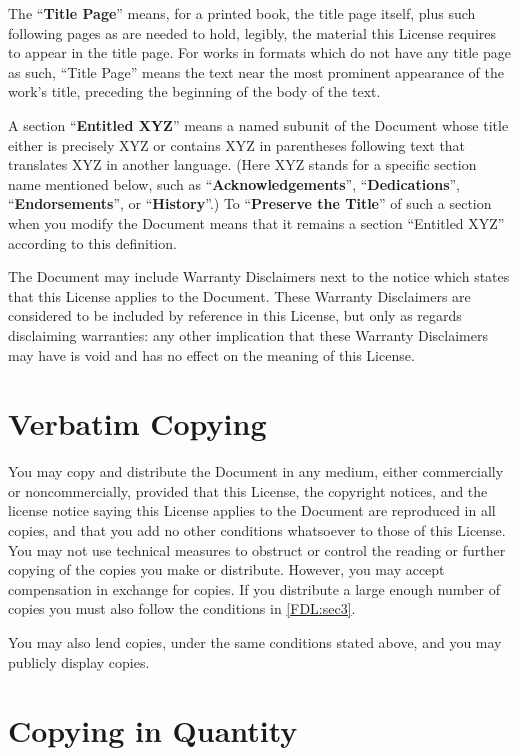 \documentclass[12pt,a4paper,openany]{book}
\begin{document}
The “\textbf{Title Page}” means, for a printed book, the title page itself,
plus such following pages as are needed to hold, legibly, the material this
License requires to appear in the title page. For works in formats which
do not have any title page as such, “Title Page” means the text near the
most prominent appearance of the work’s title, preceding the beginning of
the body of the text.

A section “\textbf{Entitled XYZ}” means a named subunit of the Document
whose title either is precisely XYZ or contains XYZ in parentheses
following text that translates XYZ in another language.  (Here XYZ stands
for a specific section name mentioned below, such as
“\textbf{Acknowledgements}”, “\textbf{Dedications}”,
“\textbf{Endorsements}”, or “\textbf{History}”.) To “\textbf{Preserve the
Title}” of such a section when you modify the Document means that it
remains a section “Entitled XYZ” according to this definition.

The Document may include Warranty Disclaimers next to the notice which
states that this License applies to the Document.  These Warranty
Disclaimers are considered to be included by reference in this
License, but only as regards disclaiming warranties: any other
implication that these Warranty Disclaimers may have is void and has
no effect on the meaning of this License.

\section{Verbatim Copying}
\label{FDL:sec2}

You may copy and distribute the Document in any medium, either commercially
or noncommercially, provided that this License, the copyright notices, and
the license notice saying this License applies to the Document are
reproduced in all copies, and that you add no other conditions whatsoever
to those of this License.  You may not use technical measures to obstruct
or control the reading or further copying of the copies you make or
distribute.  However, you may accept compensation in exchange for copies.
If you distribute a large enough number of copies you must also follow the
conditions in \autoref{FDL:sec3}.

You may also lend copies, under the same conditions stated above, and
you may publicly display copies.

\section{Copying in Quantity}
\label{FDL:sec3}
\end{document}
